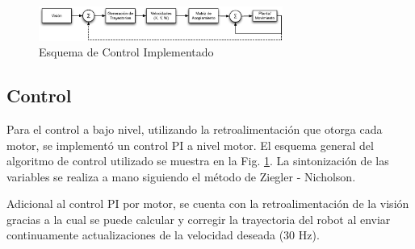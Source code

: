 \documentclass[twocolumn,10pt]{amrob}
\begin{document}

\begin{figure}
  \centering
    \includegraphics[width=8cm]{esquema_PID_motor.eps}
  \caption{Esquema de Control Implementado}
  \label{fig:ctrl}
\end{figure}
\subsection*{Control}
Para el control a bajo nivel, utilizando la retroalimentación que otorga cada motor, se implementó un control PI a nivel motor. El esquema general del algoritmo de control utilizado se muestra en la Fig. \ref{fig:ctrl}. La sintonización de las variables se realiza a mano siguiendo el método de Ziegler - Nicholson. \par
Adicional al control PI por motor, se cuenta con la retroalimentación de la visión gracias a la cual se puede calcular y corregir la trayectoria del robot al enviar continuamente actualizaciones de la velocidad deseada (30 Hz). 
\end{document}

